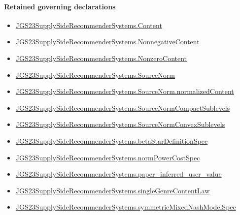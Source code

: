 \documentclass[10pt]{article}
\begin{document}
\paragraph{Retained governing declarations}
\begin{itemize}\raggedright
\item \hyperlink{governing-declaration-367305fda50f0ada}{JGS23\allowbreak{}Supply\allowbreak{}Side\allowbreak{}Recommender\allowbreak{}Systems.\allowbreak{}Content}
\item \hyperlink{governing-declaration-d426babe40b9593c}{JGS23\allowbreak{}Supply\allowbreak{}Side\allowbreak{}Recommender\allowbreak{}Systems.\allowbreak{}Nonnegative\allowbreak{}Content}
\item \hyperlink{governing-declaration-90e2ac7d13788c50}{JGS23\allowbreak{}Supply\allowbreak{}Side\allowbreak{}Recommender\allowbreak{}Systems.\allowbreak{}Nonzero\allowbreak{}Content}
\item \hyperlink{governing-declaration-6141339a5d3412d9}{JGS23\allowbreak{}Supply\allowbreak{}Side\allowbreak{}Recommender\allowbreak{}Systems.\allowbreak{}Source\allowbreak{}Norm}
\item \hyperlink{governing-declaration-dd171705f4075880}{JGS23\allowbreak{}Supply\allowbreak{}Side\allowbreak{}Recommender\allowbreak{}Systems.\allowbreak{}Source\allowbreak{}Norm.\allowbreak{}normalized\allowbreak{}Content}
\item \hyperlink{governing-declaration-0d92048317064110}{JGS23\allowbreak{}Supply\allowbreak{}Side\allowbreak{}Recommender\allowbreak{}Systems.\allowbreak{}Source\allowbreak{}Norm\allowbreak{}Compact\allowbreak{}Sublevels}
\item \hyperlink{governing-declaration-00787188baa46dbd}{JGS23\allowbreak{}Supply\allowbreak{}Side\allowbreak{}Recommender\allowbreak{}Systems.\allowbreak{}Source\allowbreak{}Norm\allowbreak{}Convex\allowbreak{}Sublevels}
\item \hyperlink{paper-prerequisite-27ab0f155f5dcf24}{JGS23\allowbreak{}Supply\allowbreak{}Side\allowbreak{}Recommender\allowbreak{}Systems.\allowbreak{}beta\allowbreak{}Star\allowbreak{}Definition\allowbreak{}Spec}
\item \hyperlink{governing-declaration-6ba13dc1cae95e6e}{JGS23\allowbreak{}Supply\allowbreak{}Side\allowbreak{}Recommender\allowbreak{}Systems.\allowbreak{}norm\allowbreak{}Power\allowbreak{}Cost\allowbreak{}Spec}
\item \hyperlink{governing-declaration-48347eafb3702717}{JGS23\allowbreak{}Supply\allowbreak{}Side\allowbreak{}Recommender\allowbreak{}Systems.\allowbreak{}paper\_\allowbreak{}inferred\_\allowbreak{}user\_\allowbreak{}value}
\item \hyperlink{governing-declaration-205216ea3d333b14}{JGS23\allowbreak{}Supply\allowbreak{}Side\allowbreak{}Recommender\allowbreak{}Systems.\allowbreak{}single\allowbreak{}Genre\allowbreak{}Content\allowbreak{}Law}
\item \hyperlink{paper-prerequisite-b412efba7deb757f}{JGS23\allowbreak{}Supply\allowbreak{}Side\allowbreak{}Recommender\allowbreak{}Systems.\allowbreak{}symmetric\allowbreak{}Mixed\allowbreak{}Nash\allowbreak{}Model\allowbreak{}Spec}
\end{itemize}
\end{document}
